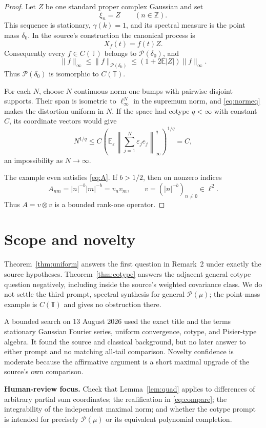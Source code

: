 \documentclass[11pt]{article}
\newcommand{\T}{\mathbb T}
\newcommand{\Pp}{\mathscr P}
\newcommand{\E}{\mathbb E}
\begin{document}
\begin{proof}
Let $Z$ be one standard proper complex Gaussian and set
\[
 \xi_n=Z\qquad(n\in\mathbb Z).
\]
This sequence is stationary, $\gamma(k)=1$, and its spectral measure is the
point mass $\delta_0$.  In the source's construction the canonical process
is
\[
 X_f(t)=f(t)Z.
\]
Consequently every $f\in C(\T)$ belongs to $\Pp(\delta_0)$, and
\begin{equation}\label{eq:normeq}
 \|f\|_\infty
 \le\|f\|_{\Pp(\delta_0)}
 \le(1+2\E|Z|)\|f\|_\infty.
\end{equation}
Thus $\Pp(\delta_0)$ is isomorphic to $C(\T)$.

For each $N$, choose $N$ continuous norm-one bumps with pairwise disjoint
supports.  Their span is isometric to $\ell_\infty^N$ in the supremum norm,
and \eqref{eq:normeq} makes the distortion uniform in $N$.  If the space had
cotype $q<\infty$ with constant $C$, its coordinate vectors would give
\[
 N^{1/q}\le C\left(\E_\varepsilon
 \left\|\sum_{j=1}^N\varepsilon_je_j\right\|_\infty^q\right)^{1/q}=C,
\]
an impossibility as $N\to\infty$.

The example even satisfies \eqref{eq:A}.  If $b>1/2$, then on nonzero
indices
\[
 A_{nm}=|n|^{-b}|m|^{-b}=v_n v_m,
 \qquad v=(|n|^{-b})_{n\ne0}\in\ell^2.
\]
Thus $A=v\otimes v$ is a bounded rank-one operator.
\end{proof}

\section{Scope and novelty}
\small

Theorem~\ref{thm:uniform} answers the first question in Remark~2 under
exactly the source hypotheses.  Theorem~\ref{thm:cotype} answers the adjacent
general cotype question negatively, including inside the source's weighted
covariance class.  We do not settle the third prompt, spectral synthesis for
general $\Pp(\mu)$; the point-mass example is $C(\T)$ and gives no
obstruction there.

A bounded search on 13 August 2026 used the exact title and the terms
stationary Gaussian Fourier series, uniform convergence, cotype, and
Pisier-type algebra.  It found the source and classical background, but no
later answer to either prompt and no matching all-tail comparison.  Novelty
confidence is moderate because the affirmative argument is a short maximal
upgrade of the source's own comparison.

\medskip
\noindent\textbf{Human-review focus.}
Check that Lemma~\ref{lem:quad} applies to differences of arbitrary partial
sum coordinates; the realification in \eqref{eq:compare}; the integrability
of the independent maximal norm; and whether the cotype prompt is intended
for precisely $\Pp(\mu)$ or its equivalent polynomial completion.
\end{document}
